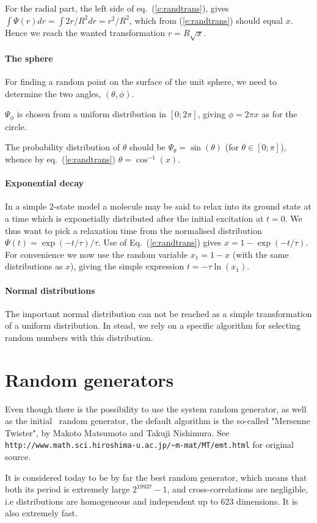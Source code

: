 For the radial part, the left side of eq.~(\ref{e:randtrans}), gives
$\int \Psi(r) dr = \int 2 r/R^2 dr = r^2/R^2$,
which from (\ref{e:randtrans}) should equal $x$.
Hence we reach the wanted transformation $r = R\sqrt{x}$.

\paragraph{The sphere}
For finding a random point on the surface of the unit sphere,
we need to determine the two angles, $(\theta, \phi)$.

$\Psi_\phi$ is chosen from a uniform distribution
in $[0; 2\pi]$, giving $\phi = 2\pi x$ as for the circle.

The probability distribution of $\theta$ should be
$\Psi_\theta=\sin(\theta)$ (for $\theta \in [0; \pi ]$),
whence by eq.~(\ref{e:randtrans}) $\theta=\cos^{-1}(x)$.

\paragraph{Exponential decay}

In a simple 2-state model a molecule may be said to relax into its ground state
at a time which is exponetially distributed after the initial excitation at $t=0$. 
We thus want to pick a relaxation time from the normalised distribution
$\Psi(t) = \exp(-t/\tau) / \tau$.
Use of Eq.~(\ref{e:randtrans}) gives
$x = 1 - \exp(-t/\tau)$. For convenience we now use the random variable
$x_1 = 1-x$ (with the same distributions as $x$),
giving the simple expression $t = - \tau \ln (x_1)$.

\paragraph{Normal distributions}
The important normal distribution can not be reached as a simple
transformation of a uniform distribution.
In stead, we rely on a specific algorithm for selecting random
numbers with this distribution.

\section{Random generators}
Even though there is the possibility to use the system random generator, as well as the initial \MCX\ random generator, the default algorithm is the so-called "Mersenne Twister", by Makoto Matsumoto and Takuji Nishimura\cite{matsumoto1998mersenne}. See \\ \verb+http://www.math.sci.hiroshima-u.ac.jp/~m-mat/MT/emt.html+ for original source.

It is considered today to be by far the best random generator, which means that both its period is extremely large $2^{19937}-1$, and cross-correlations are negligible, i.e distributions are homogeneous and independent up to 623 dimensions. It is also extremely fast.
